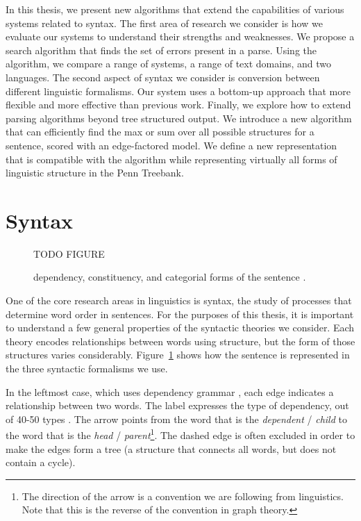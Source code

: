 In this thesis, we present new algorithms that extend the capabilities of various systems related to syntax.
The first area of research we consider is how we evaluate our systems to understand their strengths and weaknesses.
We propose a search algorithm that finds the set of errors present in a parse.
Using the algorithm, we compare a range of systems, a range of text domains, and two languages.
The second aspect of syntax we consider is conversion between different linguistic formalisms.
Our system uses a bottom-up approach that more flexible and more effective than previous work.
Finally, we explore how to extend parsing algorithms beyond tree structured output.
We introduce a new algorithm that can efficiently find the max or sum over all possible structures for a sentence, scored with an edge-factored model.
We define a new representation that is compatible with the algorithm while representing virtually all forms of linguistic structure in the Penn Treebank.

\section{Syntax}
\label{sec:syntax}

\begin{figure}
  TODO FIGURE
  \caption{
  \label{fig:syntax}
  dependency, 
  constituency, 
  and categorial forms of the sentence .
  }
\end{figure}

One of the core research areas in linguistics is syntax, the study of processes that determine word order in sentences.
For the purposes of this thesis, it is important to understand a few general properties of the syntactic theories we consider.
Each theory encodes relationships between words using structure, but the form of those structures varies considerably.
Figure~\ref{fig:syntax} shows how the sentence  is represented in the three syntactic formalisms we use.

In the leftmost case, which uses dependency grammar \parencite[\dg][]{dependency-grammar}, each edge indicates a relationship between two words.
The label expresses the type of dependency, out of 40-50 types \parencite{ud,sd}.
The arrow points from the word that is the \textit{dependent} / \textit{child} to the word that is the \textit{head} / \textit{parent}\footnote{The direction of the arrow is a convention we are following from linguistics. Note that this is the reverse of the convention in graph theory.}.
The dashed edge is often excluded in order to make the edges form a tree (a structure that connects all words, but does not contain a cycle).

